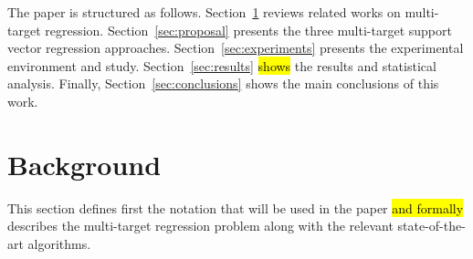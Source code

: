 \documentclass[preprint,12pt]{elsarticle}
\begin{document}
The paper is structured as follows. Section~\ref{sec:background} reviews related works on multi-target regression. Section~\ref{sec:proposal} presents the three multi-target support vector regression approaches. Section~\ref{sec:experiments} presents the experimental environment and study. Section~\ref{sec:results} \hl{shows} the results and statistical analysis. Finally, Section~\ref{sec:conclusions} shows the main conclusions of this work.
\newpage
\section{Background}\label{sec:background}
This section defines first the notation that will be used in the paper \hl{and formally} describes the multi-target regression problem along with the relevant state-of-the-art algorithms. 
\end{document}
